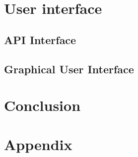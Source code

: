 \documentclass{article}
\begin{document}
\newpage
\section{User interface}
\subsection{API Interface}
\subsection{Graphical User Interface}

\newpage
\section{Conclusion}

\newpage

\renewcommand*{\UrlFont}{\rmfamily}
\printbibliography

\section{Appendix}
\end{document}
